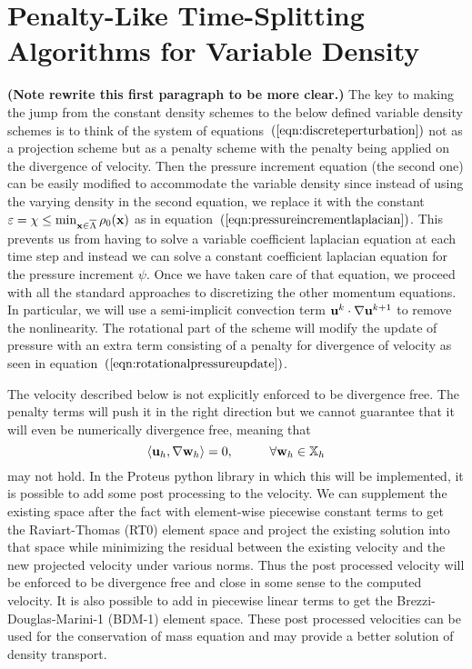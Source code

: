 \documentclass[letterpaper]{erdc}
\begin{document}
%
%
%
\section{Penalty-Like Time-Splitting Algorithms for Variable Density}\label{sec:variabledensityAlgorithm}
\textbf{(Note rewrite this first paragraph to be more clear.)} The key to making the jump from the constant density schemes to the below defined variable density schemes is to think of the system of equations~$\left(\ref{eqn:discreteperturbation}\right)$ not as a projection scheme but as a penalty scheme with the penalty being applied on the divergence of velocity.  Then the pressure increment equation (the second one) can be easily modified to accommodate the variable density since instead of using the varying density in the second equation, we replace it with the constant $\varepsilon = \chi \leq \min_{\textbf{x}\in\overline{\Lambda}}\rho_0(\textbf{x})$ as in equation~$\left(\ref{eqn:pressureincrementlaplacian}\right)$.  This prevents us from having to solve a variable coefficient laplacian equation at each time step and instead we can solve a constant coefficient laplacian equation for the pressure increment $\psi$.  Once we have taken care of that equation, we proceed with all the standard approaches to discretizing the other momentum equations.  In particular, we will use a semi-implicit convection term $\textbf{u}^{k}\cdot\nabla\textbf{u}^{k+1}$ to remove the nonlinearity.  The rotational part of the scheme will modify the update of pressure with an extra term consisting of a penalty for divergence of velocity as seen in equation~$\left(\ref{eqn:rotationalpressureupdate}\right)$.  

The velocity described below is not explicitly enforced to be divergence free.  The penalty terms will push it in the right direction but we cannot guarantee that it will even be numerically divergence free, meaning that 
\begin{equation}
  \left\langle \textbf{u}_h, \nabla\textbf{w}_h \right\rangle = 0, \hspace{1cm}\forall\textbf{w}_h\in\mathbb{X}_h
\end{equation}
may not hold.  In the Proteus python library in which this will be implemented, it is possible to add some post processing to the velocity.  We can supplement the existing space after the fact with element-wise piecewise constant terms to get the Raviart-Thomas (RT0) element space and project the existing solution into that space while minimizing the residual between the existing velocity and the new projected velocity under various norms.    Thus the post processed velocity will be enforced to be divergence free and close in some sense to the computed velocity.  It is also possible to add in piecewise linear terms to get the Brezzi-Douglas-Marini-1 (BDM-1) element space.  These post processed velocities can be used for the conservation of mass equation and may provide a better solution of density transport.
\end{document}
